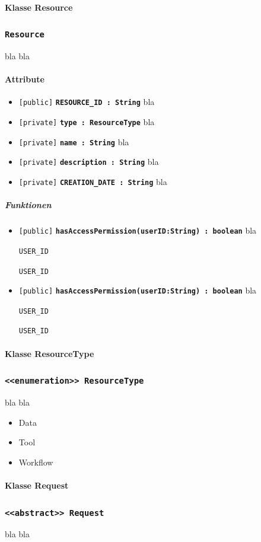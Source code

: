 \documentclass[parskip=full,11pt]{scrartcl}
\makeatletter
\newcommand{\lstInline}[2][,]{%
	\begingroup%
	\lstset{#1}%
	\begin{lrbox}{\mylisting}\lstinline!#2!\end{lrbox}%
	\setlength{\@tempdima}{\linegoal}%
	\ifdim\wd\mylisting>\@tempdima\hfill\\\fi%
	\lstinline!#2!%
	\endgroup%
}
\newcommand{\class}[1]{\subsubsection*{\lstinline[basicstyle=\ttfamily\large]{#1}}}
\newcommand{\atr}[4]{\lstinline{[#3]} \textbf{\lstinline{#1 : #2}} \newline #4}
\newcommand{\mtd}[5]{\lstinline{[#4]} \textbf{\lstinline{#1(#3) : #2}} \newline #5}
\newcommand{\inlinecode}[1]{\lstInline[breaklines=true]{#1}}
\makeatother
\begin{document}
  \paragraph*{Klasse Resource}
  \class{Resource}
 bla bla

\paragraph*{Attribute} %
\begin{itemize}
	\item \atr{RESOURCE_ID}{String}{public}{
	bla 
	}
		\item \atr{type}{ResourceType}{private}{
	bla 
	}
		\item \atr{name}{String}{private}{
	bla 
	}
		\item \atr{description}{String}{private}{
	bla 
	}
		\item \atr{CREATION_DATE}{String}{private}{
	bla 
	}
\end{itemize}
\subparagraph*{Funktionen}  %
\begin{itemize}
	\item \mtd{hasAccessPermission}{boolean}{userID:String}{public}{
	bla  \inlinecode{USER_ID}
	}
	\item \mtd{hasAccessPermission}{boolean}{userID:String}{public}{
	bla  \inlinecode{USER_ID}
	}
\end{itemize}

  \paragraph*{Klasse ResourceType}
 \class{<<enumeration>> ResourceType}
 bla bla
 
\begin{itemize}
	\item{Data}
	\item{Tool}
	\item{Workflow}
	
\end{itemize}


  \paragraph*{Klasse Request}
 \class{<<abstract>> Request}
 bla bla
 
\end{document}
